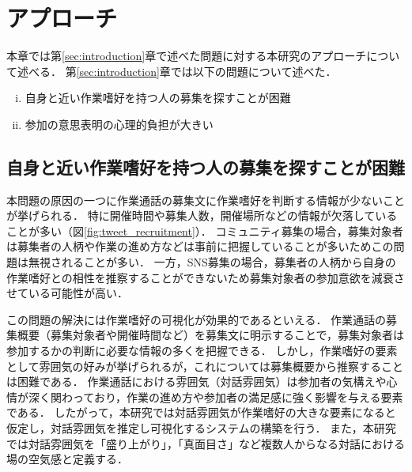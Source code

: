 \chapter{アプローチ\label{sec:approach}}
\thispagestyle{plain}

本章では第\ref{sec:introduction}章で述べた問題に対する本研究のアプローチについて述べる．
第\ref{sec:introduction}章では以下の問題について述べた．

\begin{enumerate}[i.]
    \item 自身と近い作業嗜好を持つ人の募集を探すことが困難
    \item 参加の意思表明の心理的負担が大きい
\end{enumerate}

\section{自身と近い作業嗜好を持つ人の募集を探すことが困難}\label{node:approach_i}

本問題の原因の一つに作業通話の募集文に作業嗜好を判断する情報が少ないことが挙げられる．
特に開催時間や募集人数，開催場所などの情報が欠落していることが多い（図\ref{fig:tweet_recruitment}）．
コミュニティ募集の場合，募集対象者は募集者の人柄や作業の進め方などは事前に把握していることが多いためこの問題は無視されることが多い．
一方，SNS募集の場合，募集者の人柄から自身の作業嗜好との相性を推察することができないため募集対象者の参加意欲を減衰させている可能性が高い．

この問題の解決には作業嗜好の可視化が効果的であるといえる．
作業通話の募集概要（募集対象者や開催時間など）を募集文に明示することで，募集対象者は参加するかの判断に必要な情報の多くを把握できる．
しかし，作業嗜好の要素として雰囲気の好みが挙げられるが，これについては募集概要から推察することは困難である．
作業通話における雰囲気（対話雰囲気）は参加者の気構えや心情が深く関わっており，作業の進め方や参加者の満足感に強く影響を与える要素である．
したがって，本研究では対話雰囲気が作業嗜好の大きな要素になると仮定し，対話雰囲気を推定し可視化するシステムの構築を行う．
また，本研究では対話雰囲気を「盛り上がり」，「真面目さ」など複数人からなる対話における場の空気感と定義する．

